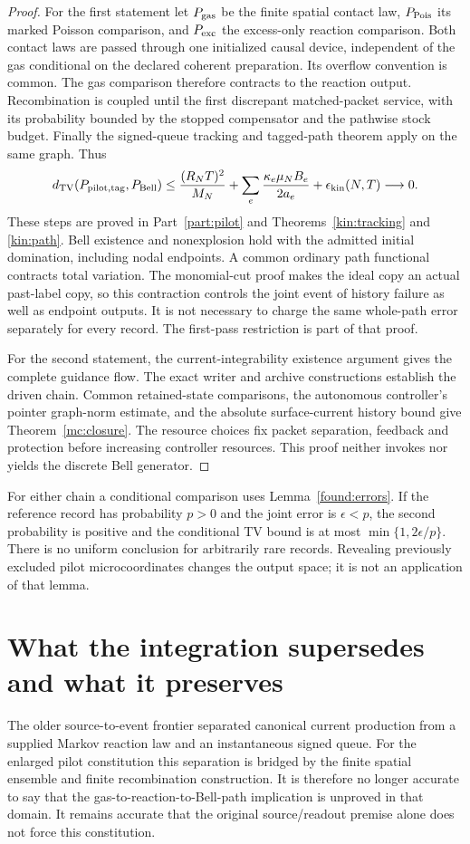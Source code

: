 \documentclass[11pt,oneside,openany]{book}
\theoremstyle{definition}
\theoremstyle{remark}\newtheorem{remark}[theorem]{Remark}
\providecommand{\TV}{d_{\mathrm{TV}}}
\begin{document}
\begin{proof}
For the first statement let $P_{\rm gas}$ be the finite spatial contact
law, $P_{\rm Pois}$ its marked Poisson comparison, and $P_{\rm exc}$ the
excess-only reaction comparison. Both contact laws are passed through
one initialized causal device, independent of the gas conditional on
the declared coherent preparation. Its overflow convention is common.
The gas comparison therefore contracts to the reaction output.
Recombination is coupled until the first discrepant matched-packet
service, with its probability bounded by the stopped compensator and
the pathwise stock budget. Finally the signed-queue tracking and
tagged-path theorem apply on the same graph. Thus
\[
 \TV(P_{\rm pilot,tag},P_{\rm Bell})\le
 \frac{(R_NT)^2}{M_N}
 +\sum_e\frac{\kappa_e\mu_N B_e}{2a_e}
 +\epsilon_{\rm kin}(N,T)\longrightarrow0.
\]
These steps are proved in Part~\ref{part:pilot} and
Theorems~\ref{kin:tracking} and \ref{kin:path}. Bell existence and
nonexplosion hold with the admitted initial domination, including nodal
endpoints. A common ordinary path functional contracts total variation.
The monomial-cut proof makes the ideal copy an actual past-label copy,
so this contraction controls the joint event of history failure as well
as endpoint outputs. It is not necessary to charge the same whole-path
error separately for every record. The first-pass restriction is part
of that proof.

For the second statement, the current-integrability existence argument
gives the complete guidance flow. The exact writer and archive
constructions establish the driven chain. Common retained-state
comparisons, the autonomous controller's pointer graph-norm estimate,
and the absolute surface-current history bound give
Theorem~\ref{mc:closure}. The resource choices fix packet separation,
feedback and protection before increasing controller resources. This
proof neither invokes nor yields the discrete Bell generator.
\end{proof}

For either chain a conditional comparison uses
Lemma~\ref{found:errors}. If the reference record has probability $p>0$
and the joint error is $\epsilon<p$, the second probability is positive
and the conditional TV bound is at most $\min\{1,2\epsilon/p\}$.
There is no uniform conclusion for arbitrarily rare records. Revealing
previously excluded pilot microcoordinates changes the output space;
it is not an application of that lemma.

\section{What the integration supersedes and what it preserves}
The older source-to-event frontier separated canonical current
production from a supplied Markov reaction law and an instantaneous
signed queue. For the enlarged pilot constitution this separation is
bridged by the finite spatial ensemble and finite recombination
construction. It is therefore no longer accurate to say that the
gas-to-reaction-to-Bell-path implication is unproved in that domain.
It remains accurate that the original source/readout premise alone
does not force this constitution.
\end{document}
